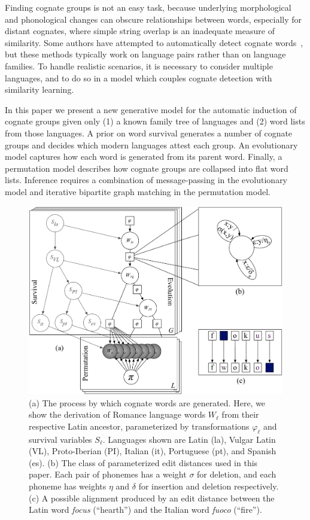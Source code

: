 \documentclass[11pt,a4paper]{article}
\begin{document}
Finding cognate groups is not an easy task, because underlying
morphological and phonological changes can obscure relationships
between words, especially for distant cognates, where simple string
overlap is an inadequate measure of similarity.  Some authors have
attempted to automatically detect cognate
words~\cite{lowe94reconstruction,oakes00computer,Kondrak01identifyingcognates,mulloni07automatic},
but these methods typically work on language pairs rather than on
language families.  To handle realistic scenarios, it is
necessary to consider multiple languages, and to do so in a model
which couples cognate detection with similarity learning.

In this paper we present a new generative model for the automatic
induction of cognate groups given only (1) a known family tree of
languages and (2) word lists from those languages.  A prior on word
survival generates a number of cognate groups and decides which
modern languages attest each group.  An evolutionary model captures
how each word is generated from its parent word.  Finally, a
permutation model describes how cognate groups are collapsed into
flat word lists.  Inference requires a combination of message-passing
in the evolutionary model and iterative bipartite graph matching
in the permutation model.

\begin{figure}
  \centering
  \includegraphics[scale=0.35]{gmodel}
  \caption{(a) The process by which cognate words are generated.
  Here, we show the derivation of Romance language words $W_\ell$
  from their respective Latin ancestor, parameterized by transformations
  $\varphi_\ell$ and survival variables $S_\ell$. Languages shown are
  Latin (la), Vulgar Latin (VL), Proto-Iberian (PI), Italian (it),
  Portuguese (pt), and Spanish (es). 
  (b) The class of parameterized edit distances used in this paper.
  Each pair of phonemes has a weight $\sigma$ for deletion, and
  each phoneme has weights $\eta$ and $\delta$ for insertion and
  deletion respectively.
  (c) A possible alignment produced by an edit distance between the
  Latin word \textit{focus} (``hearth'') and the Italian word \textit{fuoco} (``fire'').
  } \label{fig:gmodel}
\end{figure}
\end{document}
